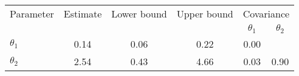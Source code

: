 \begin{tabular}{l|ccc|cc} \hline \hline 
Parameter & Estimate & Lower bound & Upper bound & \multicolumn{2}{c}{Covariance}  \\& & & & $\theta_1$ & $\theta_2$ \\ \hline 
$\theta_1$ & 0.14 & 0.06 & 0.22 & 0.00 & \\ 
$\theta_2$ & 2.54 & 0.43 & 4.66 & 0.03 & 0.90 \\ 
\hline \hline 
\end{tabular} 

